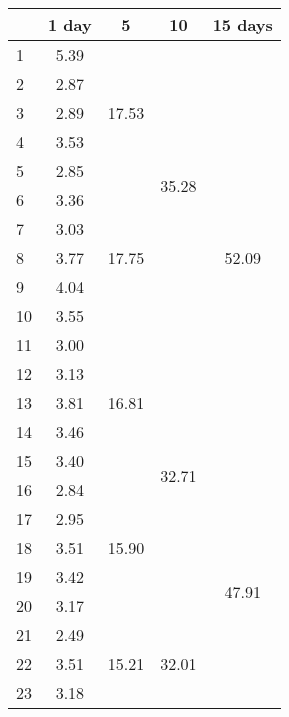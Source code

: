 \begin{center}
\begin{tabular}{| l || c | c | c | c |}\hline
 & 1 day & 5 & 10 & 15 days \\\hline
1 & \multirow{1}{*}{ 5.39 }  & \multirow{5}{*}{ 17.53 }  & \multirow{10}{*}{ 35.28 }  & \multirow{15}{*}{ 52.09 }  \\\cline{2-2}
2 & \multirow{1}{*}{ 2.87 }  & & & \\\cline{2-2}
3 & \multirow{1}{*}{ 2.89 }  & & & \\\cline{2-2}
4 & \multirow{1}{*}{ 3.53 }  & & & \\\cline{2-2}
5 & \multirow{1}{*}{ 2.85 }  & & & \\\cline{2-2}\cline{3-3}
6 & \multirow{1}{*}{ 3.36 }  & \multirow{5}{*}{ 17.75 }  & & \\\cline{2-2}
7 & \multirow{1}{*}{ 3.03 }  & & & \\\cline{2-2}
8 & \multirow{1}{*}{ 3.77 }  & & & \\\cline{2-2}
9 & \multirow{1}{*}{ 4.04 }  & & & \\\cline{2-2}
10 & \multirow{1}{*}{ 3.55 }  & & & \\\cline{2-2}\cline{3-3}\cline{4-4}
11 & \multirow{1}{*}{ 3.00 }  & \multirow{5}{*}{ 16.81 }  & \multirow{10}{*}{ 32.71 }  & \\\cline{2-2}
12 & \multirow{1}{*}{ 3.13 }  & & & \\\cline{2-2}
13 & \multirow{1}{*}{ 3.81 }  & & & \\\cline{2-2}
14 & \multirow{1}{*}{ 3.46 }  & & & \\\cline{2-2}
15 & \multirow{1}{*}{ 3.40 }  & & & \\\cline{2-2}\cline{3-3}\cline{5-5}
16 & \multirow{1}{*}{ 2.84 }  & \multirow{5}{*}{ 15.90 }  & & \multirow{15}{*}{ 47.91 }  \\\cline{2-2}
17 & \multirow{1}{*}{ 2.95 }  & & & \\\cline{2-2}
18 & \multirow{1}{*}{ 3.51 }  & & & \\\cline{2-2}
19 & \multirow{1}{*}{ 3.42 }  & & & \\\cline{2-2}
20 & \multirow{1}{*}{ 3.17 }  & & & \\\cline{2-2}\cline{3-3}\cline{4-4}
21 & \multirow{1}{*}{ 2.49 }  & \multirow{5}{*}{ 15.21 }  & \multirow{10}{*}{ 32.01 }  & \\\cline{2-2}
22 & \multirow{1}{*}{ 3.51 }  & & & \\\cline{2-2}
23 & \multirow{1}{*}{ 3.18 }  & & & \\\cline{2-2}

\end{tabular}
\end{center}
